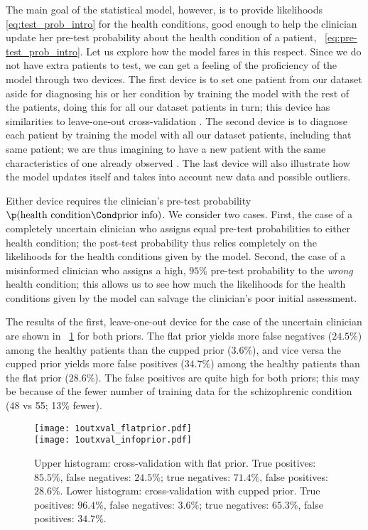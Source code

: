 The main goal of the statistical model, however, is to provide likelihoods
\eqref{eq:test_prob_intro} for the health conditions, good enough to help
the clinician update her pre-test probability about the health condition of
a patient, \eqn~\eqref{eq:pre-test_prob_intro}. Let us explore how the
model fares in this respect. Since we do not have extra patients to test,
we can get a feeling of the proficiency of the model through two devices.
The first device is to set one patient from our dataset aside for
diagnosing his or her condition by training the model with the rest of the
patients, doing this for all our dataset patients in turn; this device has
similarities to leave-one-out cross-validation \citep[vol.~2,
pp.~1454--1458]{allen1974,stone1974,kotzetal1982_r2006}. The second device
is to diagnose each patient by training the model with all our dataset
patients, including that same patient; we are thus imagining to have a new
patient with the same characteristics of one already observed
\citep[\cf][]{gelmanetal1996,draperetal1996}. The last device will also
illustrate how the model updates itself and takes into account new data and
possible outliers.

Either device requires the clinician's pre-test probability
$\p(\text{health condition}\Cond\text{prior info})$. We consider two cases.
First, the case of a completely uncertain clinician who assigns equal
pre-test probabilities to either health condition; the post-test
probability thus relies completely on the likelihoods for the health
conditions given by the model. Second, the case of a misinformed clinician
who assigns a high, $95\%$ pre-test probability to the \emph{wrong} health
condition; this allows us to see how much the likelihoods for the health
conditions given by the model can salvage the clinician's poor initial
assessment.

The results of the first, leave-one-out device for the case of the
uncertain clinician are shown in \fig~\ref{fig:xval_flatprior} for both
priors. The flat prior yields more false negatives ($24.5\%$) among the
healthy patients than the cupped prior ($3.6\%$), and vice versa the cupped
prior yields more false positives ($34.7\%$) among the healthy patients
than the flat prior ($28.6\%$). The false positives are quite high for both
priors; this may be because of the fewer number of training data for the
schizophrenic condition (48 vs 55; 13\% fewer).
\begin{figure}[!h]
  \centering
  \texttt{[image: 1outxval\_flatprior.pdf]}\\
  \texttt{[image: 1outxval\_infoprior.pdf]}%
\caption{Upper histogram: cross-validation with flat prior. True positives:
  $85.5\%$, false negatives: $24.5\%$; true negatives: $71.4\%$, false
  positives: $28.6\%$. Lower histogram: cross-validation with cupped prior.
  True positives: $96.4\%$, false negatives: $3.6\%$; true negatives:
  $65.3\%$, false positives: $34.7\%$.}
\label{fig:xval_flatprior}
\end{figure}



